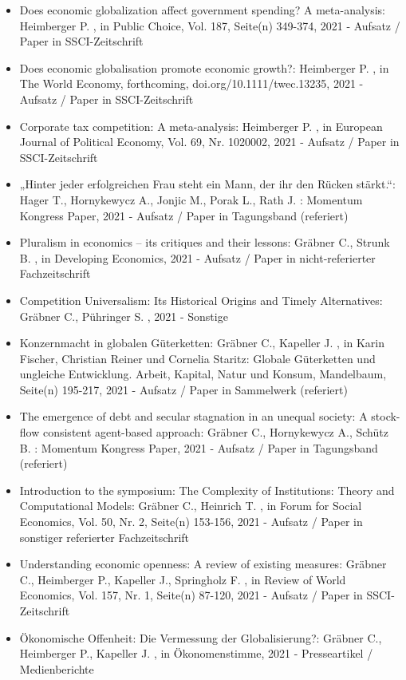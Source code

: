 \begin{itemize}
	 \item Does economic globalization affect government spending? A meta-analysis: Heimberger P. , in Public Choice, Vol. 187, Seite(n) 349-374, 2021 - Aufsatz / Paper in SSCI-Zeitschrift
	 \item Does economic globalisation promote economic growth?: Heimberger P. , in The World Economy, forthcoming, doi.org/10.1111/twec.13235, 2021 - Aufsatz / Paper in SSCI-Zeitschrift
	 \item Corporate tax competition: A meta-analysis: Heimberger P. , in European Journal of Political Economy, Vol. 69, Nr. 1020002, 2021 - Aufsatz / Paper in SSCI-Zeitschrift
	 \item „Hinter jeder erfolgreichen Frau steht ein Mann, der ihr den Rücken stärkt.“: Hager T., Hornykewycz A., Jonjic M., Porak L., Rath J. : Momentum Kongress Paper, 2021 - Aufsatz / Paper in Tagungsband (referiert)
	 \item Pluralism in economics – its critiques and their lessons: Gräbner C., Strunk B. , in Developing Economics, 2021 - Aufsatz / Paper in nicht-referierter Fachzeitschrift
	 \item Competition Universalism: Its Historical Origins and Timely Alternatives: Gräbner C., Pühringer S. , 2021 - Sonstige
	 \item Konzernmacht in globalen Güterketten: Gräbner C., Kapeller J. , in Karin Fischer, Christian Reiner und Cornelia Staritz: Globale Güterketten und ungleiche Entwicklung. Arbeit, Kapital, Natur und Konsum, Mandelbaum, Seite(n) 195-217, 2021 - Aufsatz / Paper in Sammelwerk (referiert)
	 \item The emergence of debt and secular stagnation in an unequal society: A stock-flow consistent agent-based approach: Gräbner C., Hornykewycz A., Schütz B. : Momentum Kongress Paper, 2021 - Aufsatz / Paper in Tagungsband (referiert)
	 \item Introduction to the symposium: The Complexity of Institutions: Theory and Computational Models: Gräbner C., Heinrich T. , in Forum for Social Economics, Vol. 50, Nr. 2, Seite(n) 153-156, 2021 - Aufsatz / Paper in sonstiger referierter Fachzeitschrift
	 \item Understanding economic openness: A review of existing measures: Gräbner C., Heimberger P., Kapeller J., Springholz F. , in Review of World Economics, Vol. 157, Nr. 1, Seite(n) 87-120, 2021 - Aufsatz / Paper in SSCI-Zeitschrift
	 \item Ökonomische Offenheit: Die Vermessung der Globalisierung?: Gräbner C., Heimberger P., Kapeller J. , in Ökonomenstimme, 2021 - Presseartikel / Medienberichte

\end{itemize}
